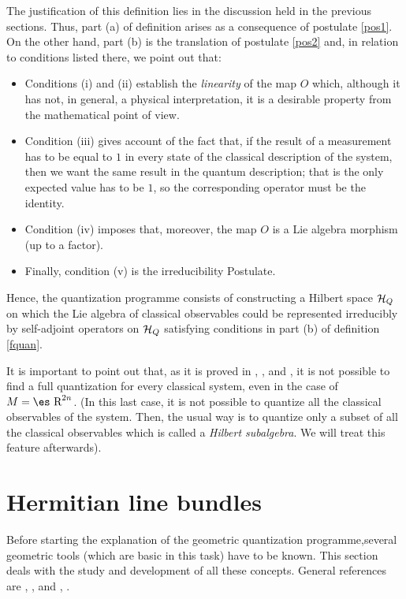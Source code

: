 \documentclass[12pt]{article}
\theoremstyle{plain}
\def\H{{\cal H}}
\def\Real{\mbox{\es R}}
\begin{document}
The justification of this definition lies in the discussion held in the
previous sections.
Thus, part (a) of definition arises as a consequence of postulate
\ref{pos1}.
On the other hand, part (b) is the translation of postulate
\ref{pos2} and, in relation to conditions listed there, we point out
that:
\begin{itemize}
\item
Conditions (i) and (ii) establish the {\it linearity} of the map $O$
which,
although it has not, in general, a physical interpretation,
it is a desirable property from the mathematical point of view.
\item
Condition (iii) gives account of the fact that,
if the result of a measurement has to be equal to $1$
in every state of the classical description of the system,
then we want the same result in the quantum description;
that is the only expected value has to be $1$, so the corresponding
operator must be the identity.
\item
Condition (iv) imposes that, moreover,
the map $O$ is a Lie algebra morphism (up to a factor).
\item
Finally, condition (v) is the irreducibility Postulate.
\end{itemize}

Hence, the quantization programme consists of constructing a Hilbert
space $\H_Q$
on which the Lie algebra of classical observables could be represented
irreducibly by self-adjoint operators on $\H_Q$
satisfying conditions in part (b) of definition \ref{fquan}.

It is important to point out that, as it is proved in
\cite{AM-78}, \cite{Go-80}, \cite{Gr-46} and \cite{Vh-51},
it is not possible to find a full quantization for every classical
system,
even in the case of $M=\Real^{2n}$. (In this last case, it is not
possible to quantize
all the classical observables of the system.
Then, the usual way is to quantize only a subset of all the classical
observables
which is called a {\it Hilbert subalgebra}. We will treat this feature
afterwards).



\section{Hermitian line bundles}


Before starting the explanation of the geometric quantization programme,several geometric tools (which are basic in this task)
have to be known. This section deals with
the study and development of all these concepts.
General references are  \cite{Bl-gq}, \cite{Ga-83}, \cite{Ko-70} and
\cite{Wo-80}, .
\end{document}
